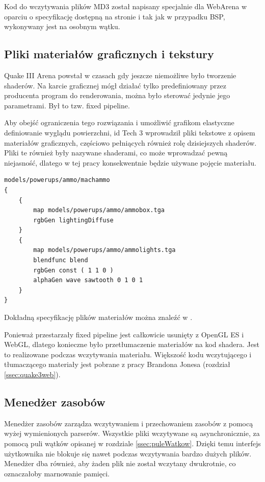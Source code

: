 Kod do wczytywania plików MD3 został napisany specjalnie dla WebArena w oparciu o specyfikację dostępną 
na stronie \cite{md3} i tak jak w przypadku BSP, wykonywany jest na osobnym wątku.

\subsection{Pliki materiałów graficznych i tekstury}

Quake III Arena powstał w czasach gdy jeszcze niemożliwe było tworzenie shaderów. Na karcie graficznej
mógł działać tylko predefiniowany przez producenta program do renderowania, można było sterować jedynie
jego parametrami. Był to tzw. fixed pipeline.

Aby obejść ograniczenia tego rozwiązania i umożliwić grafikom elastyczne definiowanie wyglądu
powierzchni, id Tech 3 wprowadził pliki tekstowe z opisem materiałów graficznych, częściowo pełniących
również rolę dzisiejszych shaderów. Pliki te również były nazywane shaderami, co może wprowadzać
pewną niejasność, dlatego w tej pracy konsekwentnie będzie używane pojęcie materiału.

\begin{lstlisting}[caption=Przykładowy opis materiału]
models/powerups/ammo/machammo
{
	{
		map models/powerups/ammo/ammobox.tga
		rgbGen lightingDiffuse
	}
	{
		map models/powerups/ammo/ammolights.tga
		blendfunc blend
		rgbGen const ( 1 1 0 )
		alphaGen wave sawtooth 0 1 0 1 
	}
}
\end{lstlisting}

Dokładną specyfikację plików materiałów można znaleźć w \cite{q3shaders}.

Ponieważ przestarzały fixed pipeline jest całkowicie usunięty z OpenGL ES i WebGL, dlatego konieczne
było przetłumaczenie materiałów na kod shadera. Jest to realizowane podczas wczytywania materiału.
Większość kodu wczytującego i tłumaczącego materiały jest pobrane z pracy Brandona Jonesa (rozdział
\ref{ssec:quake3web}).

\subsection{Menedżer zasobów}

Menedżer zasobów zarządza wczytywaniem i przechowaniem zasobów z pomocą wyżej wymienionych parserów.
Wszystkie pliki wczytywane są asynchronicznie, za pomocą puli wątków opisanej w rozdziale \ref{ssec:puleWatkow}.
Dzięki temu interfejs użytkownika nie blokuje się nawet podczas wczytywania bardzo dużych plików.
Menedżer dba również, aby żaden plik nie został wczytany dwukrotnie, co oznaczałoby marnowanie
pamięci.


